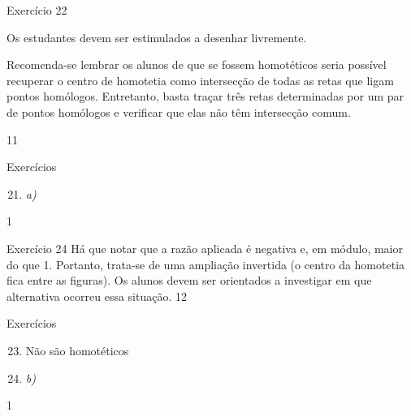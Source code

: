 \clearmargin
\begin{sugestions}{Exercício 22}
{
Os estudantes devem ser estimulados a desenhar livremente.

Recomenda-se lembrar os alunos de que se fossem homotéticos seria possível recuperar o centro de homotetia como intersecção de todas as retas que ligam pontos homólogos. Entretanto, basta traçar três retas determinadas por um par de pontos homólogos e verificar que elas não têm intersecção comum.
}{1}{1}
\end{sugestions}
\begin{answer}{Exercícios}
{\exerciselist
\begin{enumerate}\setcounter{enumi}{20}
\item \textit{a)}
\end{enumerate}
}{1}
\end{answer}

\clearmargin

\begin{sugestions}{Exercício 24}
{
Há que notar que a razão aplicada é negativa e, em módulo, maior do que 1. Portanto, trata-se de uma ampliação invertida (o centro da homotetia fica entre as figuras). Os alunos devem ser orientados a investigar em que alternativa ocorreu essa situação. 
}{1}{2}
\end{sugestions}
\begin{answer}{Exercícios}
{\exerciselist
\begin{enumerate}\setcounter{enumi}{22}
\item Não são homotéticos
\item \textit{b)}
\end{enumerate}
}{1}
\end{answer}









